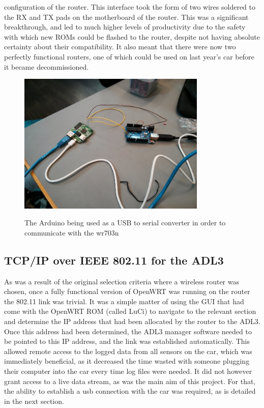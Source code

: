 configuration of the router. This interface took the form of two wires soldered to the RX and TX pads on the motherboard of the router. This was a significant breakthrough, and led to much higher levels of productivity due to the safety with which new ROMs could be flashed to the router, despite not having absolute certainty about their compatibility. It also meant that there were now two perfectly functional routers, one of which could be used on last year's car before it became decommissioned.

\begin{figure}[ht]
  \caption{The Arduino being used as a USB to serial converter in order to communicate with the wr703n}
  \centering
    \includegraphics[width=0.8\textwidth]{Images/Telemetry/TEL_hornet.jpg}
    \label{TEL_hornet}
\end{figure}

\subsection{TCP/IP over IEEE 802.11 for the ADL3}
As was a result of the original selection criteria where a wireless router was chosen, once a fully functional version of OpenWRT was running on the router the 802.11 link was trivial. It was a simple matter of using the GUI that had come with the OpenWRT ROM (called LuCi) to navigate to the relevant section and determine the IP address that had been allocated by the router to the ADL3. Once this address had been determined, the ADL3 manager software needed to be pointed to this IP address, and the link was established automatically. This allowed remote access to the logged data from all sensors on the car, which was immediately beneficial, as it decreased the time wasted with someone plugging their computer into the car every time log files were needed. It did not however grant access to a live data stream, as was the main aim of this project. For that, the ability to establish a usb connection with the car was required, as is detailed in the next section.

